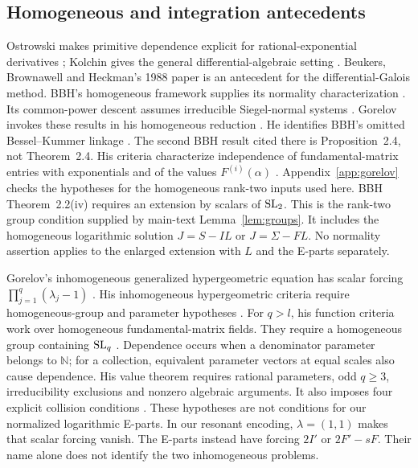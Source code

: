 \subsection*{Homogeneous and integration antecedents}
Ostrowski makes primitive dependence explicit for rational-exponential
derivatives \cite[pp.~315--316]{Ostrowski1946}; Kolchin gives the general
differential-algebraic setting \cite{Kolchin1973}.
Beukers, Brownawell and Heckman's 1988 paper
\cite{BBH1988} is an antecedent for the differential-Galois method.
BBH's homogeneous framework supplies its normality characterization
\cite[Theorem~2.2, p.~288]{BBH1988}.
Its common-power descent assumes irreducible Siegel-normal systems
\cite[Proposition~2.4, pp.~291--292]{BBH1988}.
Gorelov invokes these results in his homogeneous reduction
\cite[Lemma~13, p.~7]{Gorelov2021}.
He identifies BBH's omitted Bessel--Kummer linkage
\cite[Example~1, p.~3; Lemma~14, p.~7]{Gorelov2021}.
The second BBH result cited there is Proposition~2.4, not Theorem~2.4.
His criteria characterize independence of fundamental-matrix entries with exponentials
and of the values $F^{(i)}(\alpha)$ \cite[Theorems~1--2, pp.~4--5]{Gorelov2021}.
Appendix~\ref{app:gorelov} checks the hypotheses for the homogeneous rank-two inputs used here.
BBH Theorem~2.2(iv) requires an extension by scalars of $\operatorname{SL}_2$.
This is the rank-two group condition supplied by main-text Lemma~\ref{lem:groups}.
It includes the homogeneous logarithmic solution $J=S-I L$ or $J=\Sigma-FL$.
No normality assertion applies to the enlarged extension with $L$ and the E-parts separately.

Gorelov's inhomogeneous generalized hypergeometric equation has scalar forcing
$\prod_{j=1}^q(\lambda_j-1)$ \cite[p.~663]{Gorelov2016}.
His inhomogeneous hypergeometric criteria require homogeneous-group and parameter hypotheses
\cite[Theorems~1--3, pp.~664--665]{Gorelov2016}.
For $q>l$, his function criteria work over homogeneous fundamental-matrix fields.
They require a homogeneous group containing $\operatorname{SL}_q$
\cite[Theorems~1--2, p.~664]{Gorelov2016}.
Dependence occurs when a denominator parameter belongs to $\mathbb N$;
for a collection, equivalent parameter vectors at equal scales also cause dependence.
His value theorem requires rational parameters, odd $q\ge3$, irreducibility exclusions and nonzero algebraic arguments.
It also imposes four explicit collision conditions
\cite[Theorem~3, pp.~664--665]{Gorelov2016}.
These hypotheses are not conditions for our normalized logarithmic E-parts.
In our resonant encoding, $\lambda=(1,1)$ makes that scalar forcing vanish.
The E-parts instead have forcing $2I'$ or $2F'-sF$.
Their name alone does not identify the two inhomogeneous problems.

